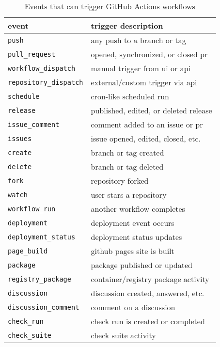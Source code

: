 \documentclass[openany, 12pt]{book}
\begin{document}
\begin{table}[h]
	\centering
	\begin{tabular}{ll}
		\toprule
		\textbf{event}                & \textbf{trigger description}          \\
		\midrule
		\texttt{push}                 & any push to a branch or tag           \\
		\texttt{pull\_request}        & opened, synchronized, or closed pr    \\
		\texttt{workflow\_dispatch}   & manual trigger from ui or api         \\
		\texttt{repository\_dispatch} & external/custom trigger via api       \\
		\texttt{schedule}             & cron-like scheduled run               \\
		\texttt{release}              & published, edited, or deleted release \\
		\texttt{issue\_comment}       & comment added to an issue or pr       \\
		\texttt{issues}               & issue opened, edited, closed, etc.    \\
		\texttt{create}               & branch or tag created                 \\
		\texttt{delete}               & branch or tag deleted                 \\
		\texttt{fork}                 & repository forked                     \\
		\texttt{watch}                & user stars a repository               \\
		\texttt{workflow\_run}        & another workflow completes            \\
		\texttt{deployment}           & deployment event occurs               \\
		\texttt{deployment\_status}   & deployment status updates             \\
		\texttt{page\_build}          & github pages site is built            \\
		\texttt{package}              & package published or updated          \\
		\texttt{registry\_package}    & container/registry package activity   \\
		\texttt{discussion}           & discussion created, answered, etc.    \\
		\texttt{discussion\_comment}  & comment on a discussion               \\
		\texttt{check\_run}           & check run is created or completed     \\
		\texttt{check\_suite}         & check suite activity                  \\
		\bottomrule
	\end{tabular}
	\caption{Events that can trigger GitHub Actions workflows}
\end{table}
\end{document}
